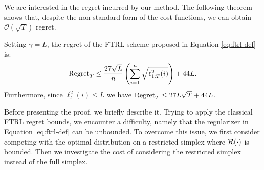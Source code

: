      
     We are interested in the regret incurred by our method. The following theorem  shows that, despite the non-standard form of the cost functions,  we can obtain $\mathcal{O}(\sqrt{T})$ regret. 
     \begin{theorem}\label{thm:full-info-main} Setting $\gamma=L$, the regret of the FTRL scheme proposed in Equation \eqref{eq:ftrl-def} is: 
\begin{equation*}
\text{Regret}_T \leq \frac{27\sqrt{L}}{n}\left(\sum_{i=1}^n \sqrt{ \ell_{1:T}^2(i) }  \right) +44L.
\end{equation*}
Furthermore, since $\ell^2_t(i) \leq L$ we have
$\text{Regret}_T \leq 27L\sqrt{T} +44L$.
\end{theorem}

    Before presenting the proof, we briefly describe it. Trying to apply the classical FTRL regret bounds, we encounter a difficulty, namely that the regularizer in Equation \eqref{eq:ftrl-def} can be unbounded. To overcome this issue, we first consider competing with the optimal distribution on a restricted simplex  where $\mathcal{R}(\cdot)$ is bounded. Then we investigate  the cost of considering  the restricted simplex instead of the full simplex. 
 
